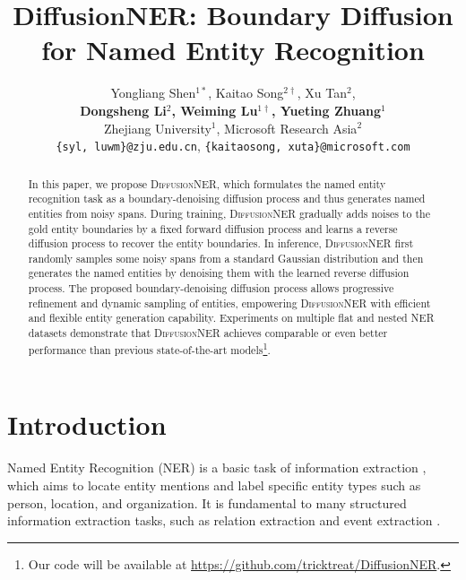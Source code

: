 \documentclass[11pt]{article}
\title{DiffusionNER: Boundary Diffusion for Named Entity Recognition}
\author{
Yongliang Shen$^{1 \ast}$, Kaitao Song$^{2\dagger}$, Xu Tan$^2$,\\
\textbf{Dongsheng Li$^2$, Weiming Lu$^{1\dagger}$, Yueting Zhuang$^1$}\\
  Zhejiang University$^1$, Microsoft Research Asia$^2$ \\ 
  \texttt{\{syl, luwm\}@zju.edu.cn},
  \texttt{\{kaitaosong, xuta\}@microsoft.com}
}
\begin{document}
\maketitle

\renewcommand{\thefootnote}{\fnsymbol{footnote}}
\renewcommand{\thefootnote}{\arabic{footnote}}

\begin{abstract}


In this paper, we propose \textsc{DiffusionNER}, which formulates the named entity recognition task as a boundary-denoising diffusion process and thus generates named entities from noisy spans. During training, \textsc{DiffusionNER} gradually adds noises to the gold entity boundaries by a fixed forward diffusion process and learns a reverse diffusion process to recover the entity boundaries. In inference, \textsc{DiffusionNER} first randomly samples some noisy spans from a standard Gaussian distribution and then generates the named entities by denoising them with the learned reverse diffusion process. 
The proposed boundary-denoising diffusion process allows progressive refinement and dynamic sampling of entities, empowering \textsc{DiffusionNER} with efficient and flexible entity generation capability.
Experiments on multiple flat and nested NER datasets demonstrate that \textsc{DiffusionNER} achieves comparable or even better performance than previous state-of-the-art models\footnote{\;Our code will be available at \url{https://github.com/tricktreat/DiffusionNER}.}.





\end{abstract}

\section{Introduction}



Named Entity Recognition (NER) is a basic task of information extraction \citep{tjong-kim-sang-de-meulder-2003-introduction}, which aims to locate entity mentions and label specific entity types such as {person}, {location}, and {organization}. It is fundamental to many structured information extraction tasks,
such as relation extraction \citep{li-ji-2014-incremental, miwa-bansal-2016-end} and event extraction \citep{mcclosky-etal-2011-event, wadden-etal-2019-entity}.
\end{document}
